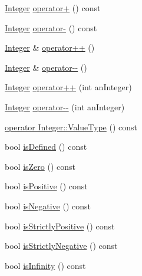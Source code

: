 \begin{DoxyCompactItemize}
\item 
\hyperlink{classlibrary_1_1core_1_1types_1_1Integer}{Integer} \hyperlink{classlibrary_1_1core_1_1types_1_1Integer_adaf665cd81d9befd1f764e11c2be9b69}{operator+} () const
\item 
\hyperlink{classlibrary_1_1core_1_1types_1_1Integer}{Integer} \hyperlink{classlibrary_1_1core_1_1types_1_1Integer_ad9670b50ae46bc0f09e4995e445dab99}{operator-\/} () const
\item 
\hyperlink{classlibrary_1_1core_1_1types_1_1Integer}{Integer} \& \hyperlink{classlibrary_1_1core_1_1types_1_1Integer_a5b6a30696dcea44bcf29e4bd0a01f490}{operator++} ()
\item 
\hyperlink{classlibrary_1_1core_1_1types_1_1Integer}{Integer} \& \hyperlink{classlibrary_1_1core_1_1types_1_1Integer_aa57a45cc369f42e8a5f98391e26b6549}{operator-\/-\/} ()
\item 
\hyperlink{classlibrary_1_1core_1_1types_1_1Integer}{Integer} \hyperlink{classlibrary_1_1core_1_1types_1_1Integer_a10dd68fe912b11ba68840f9c1fdb6ffa}{operator++} (int an\+Integer)
\item 
\hyperlink{classlibrary_1_1core_1_1types_1_1Integer}{Integer} \hyperlink{classlibrary_1_1core_1_1types_1_1Integer_ad8889e78cffb5b540d2f69d36d36e049}{operator-\/-\/} (int an\+Integer)
\item 
\hyperlink{classlibrary_1_1core_1_1types_1_1Integer_ad1cf430796727e18440d50d4764b2792}{operator Integer\+::\+Value\+Type} () const
\item 
bool \hyperlink{classlibrary_1_1core_1_1types_1_1Integer_a5edecf8abe00a8de9e021b8cc2b38c25}{is\+Defined} () const
\item 
bool \hyperlink{classlibrary_1_1core_1_1types_1_1Integer_a9b3f0fac0463a8863c46a69f14a91d15}{is\+Zero} () const
\item 
bool \hyperlink{classlibrary_1_1core_1_1types_1_1Integer_a78058bede904b0b730e6a0924296bae5}{is\+Positive} () const
\item 
bool \hyperlink{classlibrary_1_1core_1_1types_1_1Integer_a7fbd4836c6a0f0eab96689dc20e39118}{is\+Negative} () const
\item 
bool \hyperlink{classlibrary_1_1core_1_1types_1_1Integer_a45cbf113ae4656add845025e5ee6b61a}{is\+Strictly\+Positive} () const
\item 
bool \hyperlink{classlibrary_1_1core_1_1types_1_1Integer_adaa9696b642dea4b9075b5a58e141958}{is\+Strictly\+Negative} () const
\item 
bool \hyperlink{classlibrary_1_1core_1_1types_1_1Integer_a99a5c50599c55929e11c7afae4a21709}{is\+Infinity} () const

\end{DoxyCompactItemize}
